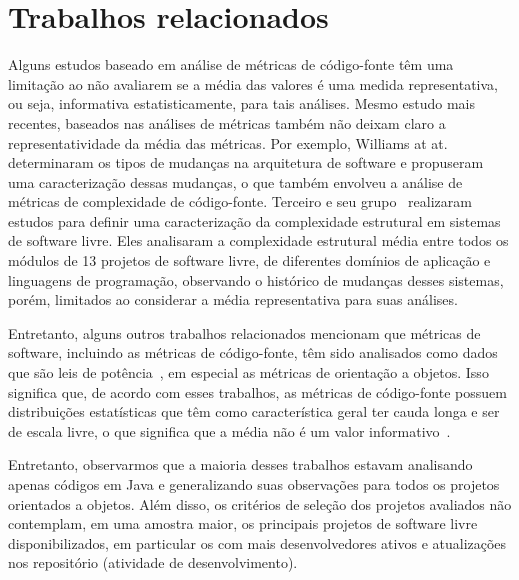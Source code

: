 \documentclass{llncs}
\begin{document}


\section{Trabalhos relacionados}

Alguns estudos baseado em análise de métricas de código-fonte têm uma limitação
ao não avaliarem se a média das valores é uma medida representativa, ou seja,
informativa estatisticamente, para tais
análises\cite{meirelles2013monitoramento}.
%
Mesmo estudo mais recentes, baseados nas análises de métricas também não deixam
claro a representatividade da média das métricas. Por exemplo, Williams at
at.\cite{williams2010} determinaram os tipos de mudanças na arquitetura de
software e propuseram uma caracterização dessas mudanças, o que também envolveu
a análise de métricas de complexidade de código-fonte.
%
Terceiro e seu grupo~\cite{terceiro2012:csmr} realizaram estudos para definir
uma caracterização da complexidade estrutural em sistemas de software livre.
%
Eles analisaram a complexidade estrutural média entre todos os módulos de 13
projetos de software livre, de diferentes domínios de aplicação e linguagens de
programação, observando o histórico de mudanças desses sistemas, porém,
limitados ao considerar a média representativa para suas análises.
%

Entretanto, alguns outros trabalhos relacionados mencionam que métricas de
software, incluindo as métricas de código-fonte, têm sido analisados como dados
que são leis de potência~\cite{clauset2007}, em especial as métricas de
orientação a objetos.
%
Isso significa que, de acordo com esses trabalhos, as métricas de código-fonte
possuem distribuições estatísticas que têm como característica geral ter cauda
longa e ser de escala livre, o que significa que a média não é um valor
informativo~\cite{clauset2007}.

Entretanto, observarmos que a maioria desses trabalhos estavam analisando
apenas códigos em Java e generalizando suas observações para todos os projetos
orientados a objetos.
%
Além disso, os critérios de seleção dos projetos avaliados não contemplam, em
uma amostra maior, os principais projetos de software livre disponibilizados,
em particular os com mais desenvolvedores ativos e atualizações nos repositório
(atividade de desenvolvimento).
\end{document}
